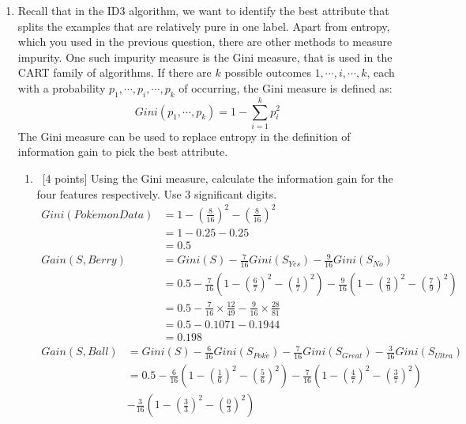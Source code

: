 \begin{enumerate}
\begin{enumerate}
\end{enumerate}
\item Recall that in the ID3 algorithm, we want to identify the best
  attribute that splits the examples that are relatively pure in one
  label. Apart from entropy, which you used in the previous question,
  there are other methods to measure impurity. One such impurity
  measure is the Gini measure, that is used in the CART family of
  algorithms. If there are $k$ possible outcomes
  $1,\cdots, i, \cdots, k$, each with a probability
  $p_1, \cdots, p_i, \cdots, p_k$ of occurring, the Gini measure is
  defined as:
\begin{equation*}
Gini(p_1, \cdots, p_k) =   1 - \sum_{i=1}^k p_i^2
\end{equation*}
The Gini measure can be used to replace entropy in the definition of information gain to pick the best attribute.
\begin{enumerate}
\item ~[4 points] Using the Gini measure, calculate the information gain for the four features respectively. Use 3 significant digits. \\
\begin{align*} 
Gini(Pok\acute emon Data) &= 1 - \left ( \frac{8}{16} \right ) ^ 2 - \left ( \frac{8}{16} \right ) ^ 2\\
&= 1 - 0.25 - 0.25\\
&= 0.5\\
Gain(S, Berry) &= Gini(S) -\frac{7}{16} Gini(S_{Yes}) -\frac{9}{16} Gini(S_{No}) \\
&= 0.5 - \frac{7}{16} \left( 1 - \left( \frac{6}{7} \right) ^2 - \left( \frac{1}{7} \right) ^2 \right) - \frac{9}{16} \left( 1 - \left( \frac{2}{9} \right) ^2 - \left( \frac{7}{9} \right) ^2 \right) \\
&= 0.5 - \frac{7}{16} \times \frac{12}{49}  - \frac{9}{16} \times \frac{28}{81} \\
&= 0.5 - 0.1071 - 0.1944\\
&=0.198
\end{align*}
\begin{align*} 
Gain(S, Ball) &= Gini(S) -\frac{6}{16} Gini(S_{Pok\acute e}) -\frac{7}{16} Gini(S_{Great})  -\frac{3}{16} Gini(S_{Ultra})\\
&= 0.5 - \frac{6}{16} \left( 1 - \left( \frac{1}{6} \right) ^2 - \left( \frac{5}{6} \right) ^2 \right) - \frac{7}{16} \left( 1 - \left( \frac{4}{7} \right) ^2 - \left( \frac{3}{7} \right) ^2 \right)\\
&- \frac{3}{16} \left( 1 - \left( \frac{3}{3} \right) ^2 - \left( \frac{0}{3} \right) ^2 \right)\\

\end{align*}
\end{enumerate}
\end{enumerate}
